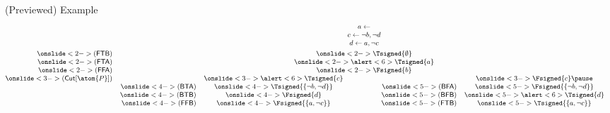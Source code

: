 \begin{frame}{(Previewed) Example}
\[
{\small
\begin{array}{@{}rc}
&a\leftarrow              \\
&c\leftarrow \neg b,\neg d  \\
&d\leftarrow     a,\neg c
\\[3pt]
\onslide<2->(\mathsf{FTB})&\onslide<2->\Tsigned{\emptyset}         \\
\onslide<2->(\mathsf{FTA})&\onslide<2->\alert<6>{\Tsigned{a}} \\
\onslide<2->(\mathsf{FFA})&\onslide<2->\Fsigned{b}
\\
\onslide<3->(\mathsf{Cut}[\atom{P}])&
\begin{array}[t]{@{}rcp{30pt}rc}
                 &\onslide<3->\alert<6>{\Tsigned{c}}         & &               & \onslide<3->\Fsigned{c}                 \pause\\
 \onslide<4->(\mathsf{BTA})  &\onslide<4->\Tsigned{\{\neg b,\neg d\}}   & & \onslide<5->(\mathsf{BFA})&
                                                                                                        \onslide<5->\Fsigned{\{\neg
                                                                                                        b,\neg d\}}         \\
 \onslide<4->(\mathsf{BTB})  &\onslide<4->\Fsigned{d}                 & & \onslide<5->(\mathsf{BFB})& \onslide<5->\alert<6>{\Tsigned{d}}       \\
 \onslide<4->(\mathsf{FFB})  &\onslide<4->\Fsigned{\{a,\neg c\}}       & & \onslide<5->(\mathsf{FTB})&
                                                                                                       \onslide<5->\Tsigned{\{a,\neg c\}}
\end{array}
\end{array}
}
\]
\end{frame}
